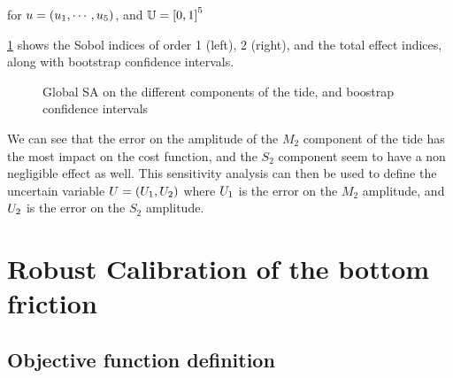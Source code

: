 \documentclass[../../Main_ManuscritThese.tex]{subfiles}
\newcommand\imgpath{/home/victor/acadwriting/Manuscrit/Text/Chapter5/img/}
\begin{document}
for $u = (u_1,\cdots,u_5)$, and $\Uspace = \interval{0}{1}^5$

\cref{fig:SA_tides} shows the Sobol indices of order 1 (left), 2
(right), and the total effect indices, along with bootstrap confidence
intervals.
\begin{figure}[ht]
  \centering
  
  \caption{\label{fig:SA_tides} Global SA on the different components of the tide, and boostrap confidence intervals}
\end{figure}

We can see that the error on the amplitude of the $M_2$ component of
the tide has the most impact on the cost function, and the $S_2$
component seem to have a non negligible effect as well. This
sensitivity analysis can then be used to define the uncertain variable
$U = (U_1, U_2)$ where $U_1$ is the error on the $M_2$
amplitude, and $U_2$ is the error on the $S_2$ amplitude.

\clearpage
\section{Robust Calibration of the bottom friction}

\subsection{Objective function definition}
\end{document}
